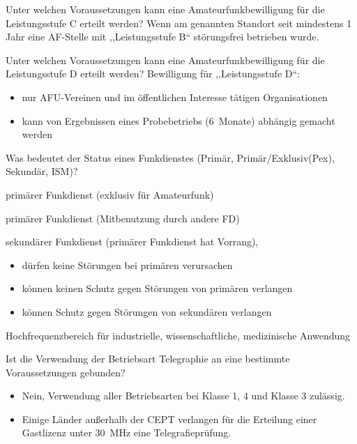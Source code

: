 \documentclass[avery5371,grid,frame,a4paper]{flashcards}
\newcommand{\card}[3]{
  \begin{flashcard}[{\chap} -- #1]{#2}#3\end{flashcard}
}
\begin{document}
\card{43}{Unter welchen Voraussetzungen kann eine Amateurfunkbewilligung für die Leistungsstufe C erteilt werden?}{
  Wenn am genannten Standort seit mindestens 1 Jahr eine AF-Stelle mit ,,Leistungsstufe B`` störungsfrei betrieben wurde.
}

\card{44}{Unter welchen Voraussetzungen kann eine Amateurfunkbewilligung für die Leistungsstufe D erteilt werden?}{
  Bewilligung für ,,Leistungsstufe D``:
  \begin{itemize}\itemsep1pt
    \item nur AFU-Vereinen und im öffentlichen Interesse tätigen Organisationen
    \item kann von Ergebnissen eines Probebetriebs (6~Monate) abhängig gemacht werden
  \end{itemize}
}

\card{45}{Was bedeutet der Status eines Funkdienstes (Primär, Primär/Exklusiv(Pex), Sekundär, ISM)?}{
 \footnotesize
  \begin{description}\itemsep0pt
    \item[Pex] primärer Funkdienst (exklusiv für Amateurfunk)
    \item[P] primärer Funkdienst (Mitbenutzung durch andere FD)
    \item[S] sekundärer Funkdienst (primärer Funkdienst hat Vorrang),
      \begin{itemize}[leftmargin=0pt,itemsep=0pt]
        \item dürfen keine Störungen bei primären verursachen
        \item können keinen Schutz gegen Störungen von primären verlangen
        \item können Schutz gegen Störungen von sekundären verlangen
      \end{itemize}
    \item[ISM] Hochfrequenzbereich für industrielle, wissenschaftliche, medizinische Anwendung
  \end{description}
}

\card{46}{Ist die Verwendung der Betriebsart Telegraphie an eine bestimmte Voraussetzungen gebunden?}{
  \begin{itemize}\itemsep1pt
    \item Nein, Verwendung aller Betriebsarten bei Klasse 1, 4 und Klasse 3 zulässig.
    \item Einige Länder außerhalb der CEPT verlangen für die Erteilung einer Gastlizenz unter \SI{30}{\mega\Hz} eine Telegrafieprüfung.
  \end{itemize}
}
\end{document}
